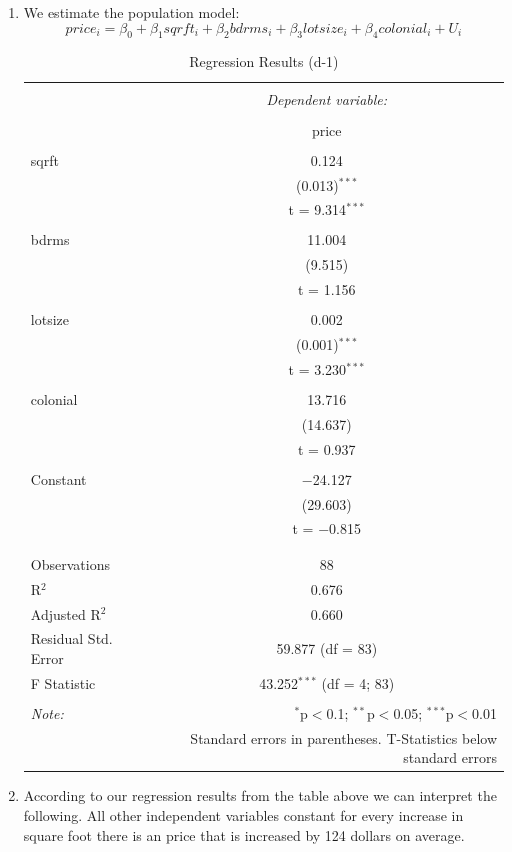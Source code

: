 \documentclass[
  12pt,
  landscape]{article}
\providecommand{\tightlist}{%
  \setlength{\itemsep}{0pt}\setlength{\parskip}{0pt}}
\begin{document}
\begin{enumerate}
\def\labelenumi{\roman{enumi})}
\tightlist
\item
  We estimate the population model: \[
  price_i = \beta_0 + \beta_1sqrft_i + \beta_2bdrms_i + \beta_3lotsize_i + \beta_4colonial_i + U_i
  \]

  \begin{table}[!htbp] \centering 
    \caption{Regression Results (d-1)} 
    \label{} 
  \begin{tabular}{@{\extracolsep{5pt}}lc} 
  \\[-1.8ex]\hline 
  \hline \\[-1.8ex] 
   & \multicolumn{1}{c}{\textit{Dependent variable:}} \\ 
  \cline{2-2} 
  \\[-1.8ex] & price \\ 
  \hline \\[-1.8ex] 
   sqrft & 0.124 \\ 
    & (0.013)$^{***}$ \\ 
    & t = 9.314$^{***}$ \\ 
    & \\ 
   bdrms & 11.004 \\ 
    & (9.515) \\ 
    & t = 1.156 \\ 
    & \\ 
   lotsize & 0.002 \\ 
    & (0.001)$^{***}$ \\ 
    & t = 3.230$^{***}$ \\ 
    & \\ 
   colonial & 13.716 \\ 
    & (14.637) \\ 
    & t = 0.937 \\ 
    & \\ 
   Constant & $-$24.127 \\ 
    & (29.603) \\ 
    & t = $-$0.815 \\ 
    & \\ 
  \hline \\[-1.8ex] 
  Observations & 88 \\ 
  R$^{2}$ & 0.676 \\ 
  Adjusted R$^{2}$ & 0.660 \\ 
  Residual Std. Error & 59.877 (df = 83) \\ 
  F Statistic & 43.252$^{***}$ (df = 4; 83) \\ 
  \hline 
  \hline \\[-1.8ex] 
  \textit{Note:}  & \multicolumn{1}{r}{$^{*}$p$<$0.1; $^{**}$p$<$0.05; $^{***}$p$<$0.01} \\ 
   & \multicolumn{1}{r}{Standard errors in parentheses. T-Statistics below standard errors} \\ 
  \end{tabular} 
  \end{table}
\item
  According to our regression results from the table above we can
  interpret the following. All other independent variables constant for
  every increase in square foot there is an price that is increased by
  124 dollars on average.
\end{enumerate}
\end{document}
